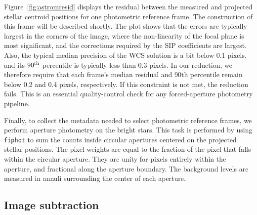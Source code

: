 \documentclass[12pt,twocolumn,tighten]{aastex62}
\begin{document}
Figure~\ref{fig:astromresid} displays the residual between
the measured and projected stellar centroid
positions for one photometric reference frame.
The construction of this frame will be described shortly.
The plot shows that the errors
are typically largest in the corners of the image,
where the non-linearity of the focal plane is most significant, and
the corrections required by the SIP coefficients are largest.
Also, the typical median precision of the WCS solution is a bit below
0.1 pixels, and its $90^{\rm th}$ percentile is typically less than
0.3 pixels.
In our reduction,
we therefore require
that each frame's median residual and 90th percentile remain
below 0.2 and 0.4
pixels, respectively. If this constraint is not met, the reduction fails.
This is an essential quality-control check for any forced-aperture
photometry pipeline.

Finally, to collect the metadata needed
to select photometric reference frames,
we perform
aperture photometry on the
bright stars.
This task is
performed by using \texttt{fiphot} to
sum the counts inside 
circular apertures centered on the projected stellar positions.
The pixel weights are equal to the fraction of the pixel
that falls within the circular aperture.  They are unity for pixels
entirely within the aperture, and fractional along the aperture
boundary. %
The background levels are measured in annuli surrounding
the center of each aperture. 


\subsection{Image subtraction}
\label{subsec:imagesubtraction}
\end{document}
